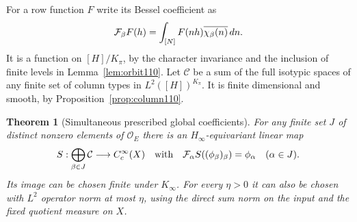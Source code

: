 \documentclass[a4paper,11pt]{article}
\newtheorem{theorem}[proposition]{Theorem}
\theoremstyle{definition}
\theoremstyle{remark}
\numberwithin{equation}{section}
\newcommand{\OO}{\mathcal O}
\begin{document}
For a row function \(F\) write its Bessel coefficient as
\[
       {\cal F}_\beta F(h)=
             \int_{[N]}F(nh)\overline{\chi_\beta(n)}\,dn.
\]
It is a function on \([H]/K_\pi\), by the character invariance
and the inclusion of finite levels in Lemma~\ref{lem:orbit110}.
Let \(\mathcal C\) be a sum of the full isotypic spaces of any
finite set of column types in \(L^2([H])^{K_\pi}\). It is finite
dimensional and smooth, by Proposition~\ref{prop:column110}.

\begin{theorem}[Simultaneous prescribed global coefficients]\label{thm:section110}
For any finite set \(J\) of distinct nonzero elements of \(\OO_E\)
there is an \(H_\infty\)-equivariant linear map
\[
         S:\bigoplus_{\beta\in J}\mathcal C
            \longrightarrow C_c^\infty(X)
     \quad\text{with}\quad
         {\cal F}_\alpha S((\phi_\beta)_\beta)=\phi_\alpha
                     \quad(\alpha\in J).
\]
Its image can be chosen finite under \(K_\infty\). For every
\(\eta>0\) it can also be chosen with \(L^2\) operator norm
at most \(\eta\), using the direct sum norm on the input
and the fixed quotient measure on \(X\).
\end{theorem}
\end{document}
